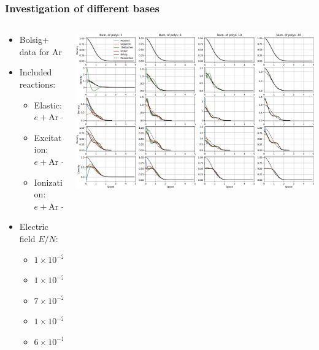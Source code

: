 \documentclass[mathserif, aspectratio=169]{beamer}
\begin{document}
\begin{frame}
\frametitle{Investigation of different bases}
%
\begin{columns}[T]
\begin{column}{0.3\linewidth}
\begin{itemize}
\item Bolsig+ data for Ar 
\item Included reactions:
\hspace{-0.5in}
\begin{itemize}
\item Elastic: $e + \text{Ar} \rightarrow e + \text{Ar}$
\item Excitation: $e + \text{Ar} \rightarrow e + \text{Ar}^*$
\item Ionization: $e + \text{Ar} \rightarrow e + \text{Ar}^+ + e$
\end{itemize}
\item Electric field $E/N$:
\begin{itemize}
\item $1\times 10^{-26}\, \text{V} \cdot \text{m}^2$
\item $1\times 10^{-24}\, \text{V} \cdot \text{m}^2$
\item $7\times 10^{-24}\, \text{V} \cdot \text{m}^2$
\item $1\times 10^{-23}\, \text{V} \cdot \text{m}^2$
\item $6\times 10^{-19}\, \text{V} \cdot \text{m}^2$
\end{itemize}
\end{itemize}
\end{column}
\begin{column}{0.7\linewidth}
  \vspace{-0.35in}
  \begin{center}
   \includegraphics[width=\textwidth]{figures/bolsig_visual_lin.png}
  \end{center}
\end{column}
\end{columns}
%
\end{frame}
\end{document}
